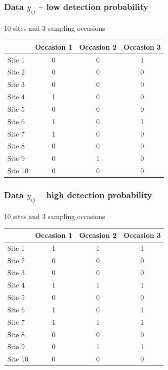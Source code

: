 \documentclass[color=usenames,dvipsnames]{beamer}\usepackage[]{graphicx}\usepackage[]{color}
\begin{document}
\begin{frame}
  \frametitle{Data $y_{ij}$ -- low detection probability}
  {%
    \centering \large 10 sites and 3 sampling occasions \par}
  \vspace{0.3cm}
  \begin{center}
    \small
    \begin{tabular}{lccc}
      \hline
      & Occasion 1 & Occasion 2 & Occasion 3 \\
      \hline
      Site 1 & 0 & 0 & 1 \\
      Site 2 & 0 & 0 & 0 \\
      Site 3 & 0 & 0 & 0 \\
      Site 4 & 1 & 0 & 0 \\
      Site 5 & 0 & 0 & 0 \\
      Site 6 & 1 & 0 & 1 \\
      Site 7 & 1 & 0 & 0 \\
      Site 8 & 0 & 0 & 0 \\
      Site 9 & 0 & 1 & 0 \\
      Site 10 & 0 & 0 & 0 \\
      \hline
    \end{tabular}
  \end{center}
\end{frame}





\begin{frame}
  \frametitle{Data $y_{ij}$ -- high detection probability}
  {%
    \centering \large 10 sites and 3 sampling occasions \par}
  \vspace{0.3cm}
  \begin{center}
    \small
    \begin{tabular}{lccc}
      \hline
      & Occasion 1 & Occasion 2 & Occasion 3 \\
      \hline
      Site 1 & 1 & 1 & 1 \\
      Site 2 & 0 & 0 & 0 \\
      Site 3 & 0 & 0 & 0 \\
      Site 4 & 1 & 1 & 1 \\
      Site 5 & 0 & 0 & 0 \\
      Site 6 & 1 & 0 & 1 \\
      Site 7 & 1 & 1 & 1 \\
      Site 8 & 0 & 0 & 0 \\
      Site 9 & 0 & 1 & 1 \\
      Site 10 & 0 & 0 & 0 \\
      \hline
    \end{tabular}
  \end{center}
\end{frame}
\end{document}

